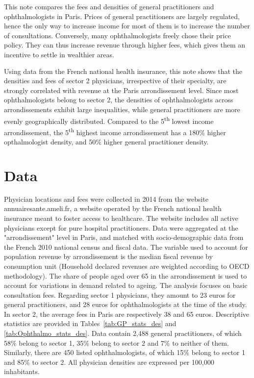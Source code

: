 \documentclass[11pt]{article}
\begin{document}
This note compares the fees and densities of general practitioners and ophthalmologists in Paris. Prices of general practitioners are largely regulated, hence the only way to increase income for most of them is to increase the number of consultations. Conversely, many ophthalmologists freely chose their price policy. They can thus increase revenue through higher fees, which gives them an incentive to settle in wealthier areas.

Using data from the French national health insurance, this note shows that the densities and fees of sector 2 physicians, irrespective of their specialty, are strongly correlated with revenue at the Paris arrondissement level. Since most ophthalmologists belong to sector 2, the densities of ophthalmologists across arrondissements exhibit large inequalities, while general practitioners are more evenly geographically distributed. Compared to the 5\textsuperscript{th} lowest income arrondissement, the 5\textsuperscript{th} highest income arrondissement has a 180\% higher opthalmologist density, and 50\% higher general practitioner density.

\section{Data}

Physician locations and fees were collected in 2014 from the website annuairesante.ameli.fr, a website operated by the French national health insurance meant to foster access to healthcare. The website includes all active physicians except for pure hospital practitioners. Data were aggregated at the "arrondissement" level in Paris, and matched with socio-demographic data from the French 2010 national census and fiscal data. The variable used to account for population revenue by arrondissement is the median fiscal revenue by consumption unit (Household declared revenues are weighted according to OECD methodology). The share of people aged over 65 in the arrondissement is used to account for variations in demand related to ageing. The analysis focuses on basic consultation fees. Regarding sector 1 physicians, they amount to 23 euros for general practitioners, and 28 euros for ophthalmologists at the time of the study. In sector 2, the average fees in Paris are respectively 38 and 65 euros. Descriptive statistics are provided in Tables~\ref{tab:GP_stats_des} and \ref{tab:Ophthalmo_stats_des}. Data contain 2,488 general practitioners, of which 58\% belong to sector 1, 35\% belong to sector 2 and 7\% to neither of them. Similarly, there are 450 listed ophthalmologists, of which 15\% belong to sector 1 and 85\% to sector 2. All physician densities are expressed per 100,000 inhabitants.
\end{document}
